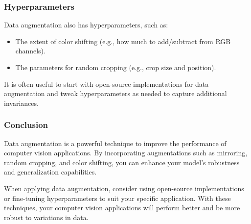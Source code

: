 \documentclass[letterpaper,12pt,notitlepage,twoside]{report}
\begin{document}
\subsubsection*{Hyperparameters}
Data augmentation also has hyperparameters, such as:
\begin{itemize}
    \item The extent of color shifting (e.g., how much to add/subtract from RGB channels).
    \item The parameters for random cropping (e.g., crop size and position).
\end{itemize}
It is often useful to start with open-source implementations for data augmentation and tweak hyperparameters as needed to capture additional invariances.

\subsubsection*{Conclusion}
Data augmentation is a powerful technique to improve the performance of computer vision applications. By incorporating augmentations such as mirroring, random cropping, and color shifting, you can enhance your model's robustness and generalization capabilities. 

When applying data augmentation, consider using open-source implementations or fine-tuning hyperparameters to suit your specific application. With these techniques, your computer vision applications will perform better and be more robust to variations in data.
\end{document}
